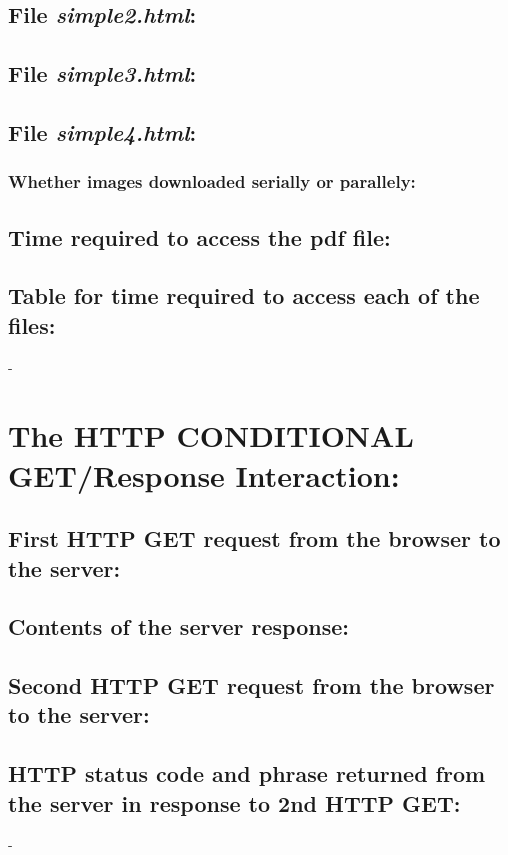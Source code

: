 \documentclass[]{report}
\begin{document}
\subsection{File \textit{simple2.html}:}

\subsection{File \textit{simple3.html}:}

\subsection{File \textit{simple4.html}:}
\subsubsection{Whether images downloaded serially or parallely:}

\subsection{Time required to access the pdf file:}

\subsection{Table for time required to access each of the files:}
-


\section{The HTTP CONDITIONAL GET/Response Interaction:}
\subsection{First HTTP GET request from the browser to the server:}

\subsection{Contents of the server response:}

\subsection{Second HTTP GET request from the browser to the server: }

\subsection{HTTP status code and phrase returned from the server in response to 2nd HTTP GET:}
-
\end{document}
